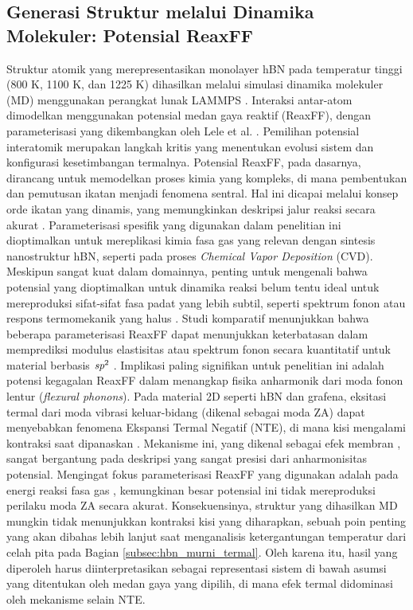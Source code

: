 \subsection{Generasi Struktur melalui Dinamika Molekuler: Potensial ReaxFF}
\label{subsec:md_reaxff}
Struktur atomik yang merepresentasikan monolayer hBN pada temperatur tinggi (800 K, 1100 K, dan 1225 K) dihasilkan melalui simulasi dinamika molekuler (MD) menggunakan perangkat lunak LAMMPS \citep{Plimpton1995}.
Interaksi antar-atom dimodelkan menggunakan potensial medan gaya reaktif (ReaxFF), dengan parameterisasi yang dikembangkan oleh Lele et al. \citep{Lele2022}.
Pemilihan potensial interatomik merupakan langkah kritis yang menentukan evolusi sistem dan konfigurasi kesetimbangan termalnya.
Potensial ReaxFF, pada dasarnya, dirancang untuk memodelkan proses kimia yang kompleks, di mana pembentukan dan pemutusan ikatan menjadi fenomena sentral.
Hal ini dicapai melalui konsep orde ikatan yang dinamis, yang memungkinkan deskripsi jalur reaksi secara akurat \citep{Weismiller2010, vanDuin2001, Senftle2016}.
Parameterisasi spesifik yang digunakan dalam penelitian ini \citep{Lele2022} dioptimalkan untuk mereplikasi kimia fasa gas yang relevan dengan sintesis nanostruktur hBN, seperti pada proses \emph{Chemical Vapor Deposition} (CVD).
Meskipun sangat kuat dalam domainnya, penting untuk mengenali bahwa potensial yang dioptimalkan untuk dinamika reaksi belum tentu ideal untuk mereproduksi sifat-sifat fasa padat yang lebih subtil, seperti spektrum fonon atau respons termomekanik yang halus \citep{Fthenakis2022, Deringer2020}.
Studi komparatif menunjukkan bahwa beberapa parameterisasi ReaxFF dapat menunjukkan keterbatasan dalam memprediksi modulus elastisitas atau spektrum fonon secara kuantitatif untuk material berbasis $\emph{sp}^2$ \citep{Fthenakis2022, Deringer2020}.
Implikasi paling signifikan untuk penelitian ini adalah potensi kegagalan ReaxFF dalam menangkap fisika anharmonik dari moda fonon lentur (\emph{flexural phonons}).
Pada material 2D seperti hBN dan grafena, eksitasi termal dari moda vibrasi keluar-bidang (dikenal sebagai moda ZA) dapat menyebabkan fenomena Ekspansi Termal Negatif (NTE), di mana kisi mengalami kontraksi saat dipanaskan \citep{Sarikurt2022, Mann2017}.
Mekanisme ini, yang dikenal sebagai efek membran \citep{Yates1972}, sangat bergantung pada deskripsi yang sangat presisi dari anharmonisitas potensial.
Mengingat fokus parameterisasi ReaxFF yang digunakan adalah pada energi reaksi fasa gas \citep{Lele2022}, kemungkinan besar potensial ini tidak mereproduksi perilaku moda ZA secara akurat.
Konsekuensinya, struktur yang dihasilkan MD mungkin tidak menunjukkan kontraksi kisi yang diharapkan, sebuah poin penting yang akan dibahas lebih lanjut saat menganalisis ketergantungan temperatur dari celah pita pada Bagian \ref{subsec:hbn_murni_termal}.
Oleh karena itu, hasil yang diperoleh harus diinterpretasikan sebagai representasi sistem di bawah asumsi yang ditentukan oleh medan gaya yang dipilih, di mana efek termal didominasi oleh mekanisme selain NTE.
